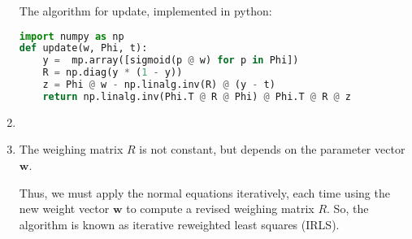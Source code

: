 \documentclass{amsart}
\begin{document}
\begin{enumerate}[label=\textbf{(\Roman*)}]
        The algorithm for update, implemented in python:

        \begin{lstlisting}[language=Python]
import numpy as np
def update(w, Phi, t):
    y =  mp.array([sigmoid(p @ w) for p in Phi])
    R = np.diag(y * (1 - y))
    z = Phi @ w - np.linalg.inv(R) @ (y - t)
    return np.linalg.inv(Phi.T @ R @ Phi) @ Phi.T @ R @ z
        \end{lstlisting}




        \item 
        \item The weighing matrix \(R\) is not constant, but depends on the parameter vector \(\mathbf{w}\).
        
        Thus, we must apply the normal equations iteratively, each time using the new weight vector \(\mathbf{w}\) to compute a revised weighing matrix \(R\). So, the algorithm is known as iterative reweighted least squares (IRLS).
    \end{enumerate}
\end{document}
